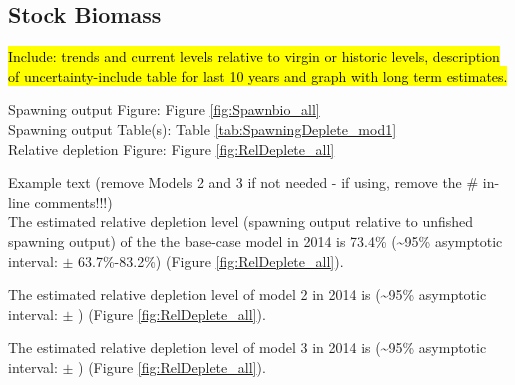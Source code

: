 \documentclass[12pt,]{article}
\begin{document}
\FloatBarrier

\subsection*{Stock Biomass}\label{stock-biomass}

\hl{Include: trends and current levels relative to virgin or historic levels, 
description of uncertainty-include table for last 10 years and graph with 
long term estimates.}

Spawning output Figure: Figure \ref{fig:Spawnbio_all}\\
Spawning output Table(s): Table \ref{tab:SpawningDeplete_mod1}\\
Relative depletion Figure: Figure \ref{fig:RelDeplete_all}

Example text (remove Models 2 and 3 if not needed - if using, remove the
\# in-line comments!!!)\\
The estimated relative depletion level (spawning output relative to
unfished spawning output) of the the base-case model in 2014 is 73.4\%
(\textasciitilde{}95\% asymptotic interval: \(\pm\) 63.7\%-83.2\%)
(Figure \ref{fig:RelDeplete_all}).

The estimated relative depletion level of model 2 in 2014 is
(\textasciitilde{}95\% asymptotic interval: \(\pm\) ) (Figure
\ref{fig:RelDeplete_all}).

The estimated relative depletion level of model 3 in 2014 is
(\textasciitilde{}95\% asymptotic interval: \(\pm\) ) (Figure
\ref{fig:RelDeplete_all}).

\FloatBarrier
\end{document}
